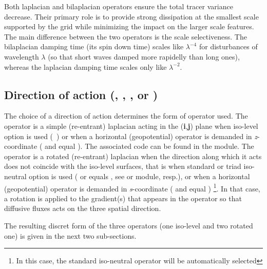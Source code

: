 \documentclass[../main/NEMO_manual]{subfiles}
\begin{document}
Both laplacian and bilaplacian operators ensure the total tracer variance decrease.
Their primary role is to provide strong dissipation at the smallest scale supported by the grid while
minimizing the impact on the larger scale features.
The main difference between the two operators is the scale selectiveness.
The bilaplacian damping time (\ie its spin down time) scales like $\lambda^{-4}$ for
disturbances of wavelength $\lambda$ (so that short waves damped more rapidelly than long ones),
whereas the laplacian damping time scales only like $\lambda^{-2}$.

\subsection[Action direction (\protect\np{ln\_traldf}\{\_lev,\_hor,\_iso,\_triad\})]{Direction of action (\protect{}, \protect{}, \protect{}, or \protect{}) } 
\label{subsec:TRA_ldf_dir}

The choice of a direction of action determines the form of operator used.
The operator is a simple (re-entrant) laplacian acting in the (\textbf{i},\textbf{j}) plane when
iso-level option is used (~) or
when a horizontal (\ie geopotential) operator is demanded in \textit{z}-coordinate
( and  equal ).
The associated code can be found in the  module.
The operator is a rotated (re-entrant) laplacian when
the direction along which it acts does not coincide with the iso-level surfaces,
that is when standard or triad iso-neutral option is used
( or  equals ,
see  or  module, resp.), or
when a horizontal (\ie geopotential) operator is demanded in \textit{s}-coordinate
( and  equal )
\footnote{In this case, the standard iso-neutral operator will be automatically selected}.
In that case, a rotation is applied to the gradient(s) that appears in the operator so that
diffusive fluxes acts on the three spatial direction.

The resulting discret form of the three operators (one iso-level and two rotated one) is given in
the next two sub-sections.
\end{document}

